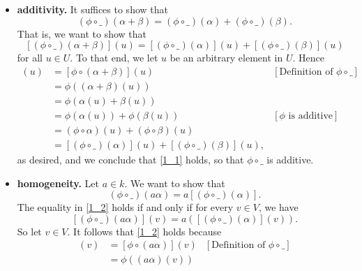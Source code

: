 \documentclass[9pt]{article}
\begin{document}
\begin{enumerate}
      \begin{itemize}
         \item \textbf{additivity.} It suffices to show that
               \begin{equation} \label{1_1}
                  (\phi\circ\_)(\alpha+\beta) = (\phi\circ\_)(\alpha) +
                  (\phi\circ\_)(\beta).
               \end{equation}
               That is, we want to show that
               $$[(\phi\circ\_)(\alpha+\beta)](u) = [(\phi\circ\_)(\alpha)](u) +
                 [(\phi\circ\_)(\beta)](u)$$
               for all $u \in U$. To that end, we let $u$ be an arbitrary
               element in $U$. Hence
               \begin{align*}
                  [(\phi\circ\_)(\alpha+\beta)](u) &=
                     [\phi\circ(\alpha+\beta)](u)
                        &[\text{Definition of }\phi\circ\_ ] \\
                     &= \phi((\alpha+\beta)(u)) \\
                     &= \phi(\alpha(u)+\beta(u)) \\
                     &= \phi(\alpha(u))+\phi(\beta(u))
                        &[\phi \text{ is additive}] \\
                     &= (\phi\circ\alpha)(u)+(\phi\circ\beta)(u) \\
                     &= [(\phi\circ\_)(\alpha)](u) + [(\phi\circ\_)(\beta)](u),
               \end{align*}
               as desired, and we conclude that \eqref{1_1} holds, so that
               $\phi\circ\_$ is additive.
         \item \textbf{homogeneity.} Let $a \in k$. We want to show that
               \begin{equation} \label{1_2}
                  (\phi\circ\_)(a\alpha) = a[(\phi\circ\_)(\alpha)].
               \end{equation}
               The equality in \eqref{1_2} holds if and only if for every
               $v \in V$, we have
               $$[(\phi\circ\_)(a\alpha)](v) = a([(\phi\circ\_)(\alpha)](v)).$$
               So let $v \in V$. It follows that \eqref{1_2} holds because
               \begin{align*}
                  [(\phi\circ\_)(a\alpha)](v) &= [\phi\circ(a\alpha)](v)
                     &[\text{Definition of }\phi\circ\_ ] \\
                     &= \phi((a\alpha)(v)) \\

\end{align*}
\end{itemize}
\end{enumerate}
\end{document}
